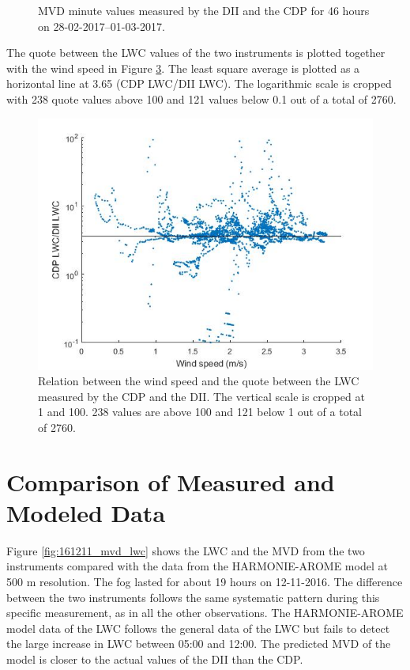 \begin{figure}[ht]
\begin{subfigure}{.49\textwidth}
  \label{fig:0228-0301_MVD_DIIvsCDP}
\end{subfigure}
\caption{MVD minute values measured by the DII and the CDP for 46 hours on 28-02-2017--01-03-2017.}
\label{fig:0228-0301_mvd}
\end{figure}

The quote between the LWC values of the two instruments is plotted together with the wind speed in Figure \ref{fig:0228-0301_WSvslwcquote}. The least square average is plotted as a horizontal line at 3.65 (CDP LWC/DII LWC). The logarithmic scale is cropped with 238 quote values above 100 and 121 values below 0.1 out of a total of 2760.

\begin{figure}[ht]
  \centering
  \includegraphics[width=0.5\linewidth]{figures/0228-0301/Relation_between_lwcquote_and_wind_speed_17022801-17030123}
\caption{Relation between the wind speed and the quote between the LWC measured by the CDP and the DII. The vertical scale is cropped at 1 and 100. 238 values are above 100 and 121 below 1 out of a total of 2760.}
\label{fig:0228-0301_WSvslwcquote}
\end{figure}

\section{Comparison of Measured and Modeled Data}

Figure \ref{fig:161211_mvd_lwc} shows the LWC and the MVD from the two instruments compared with the data from the HARMONIE-AROME model at 500 m resolution. The fog lasted for about 19 hours on 12-11-2016. The difference between the two instruments follows the same systematic pattern during this specific measurement, as in all the other observations. The HARMONIE-AROME model data of the LWC follows the general data of the LWC but fails to detect the large increase in LWC between 05:00 and 12:00. The predicted MVD of the model is closer to the actual values of the DII than the CDP.

